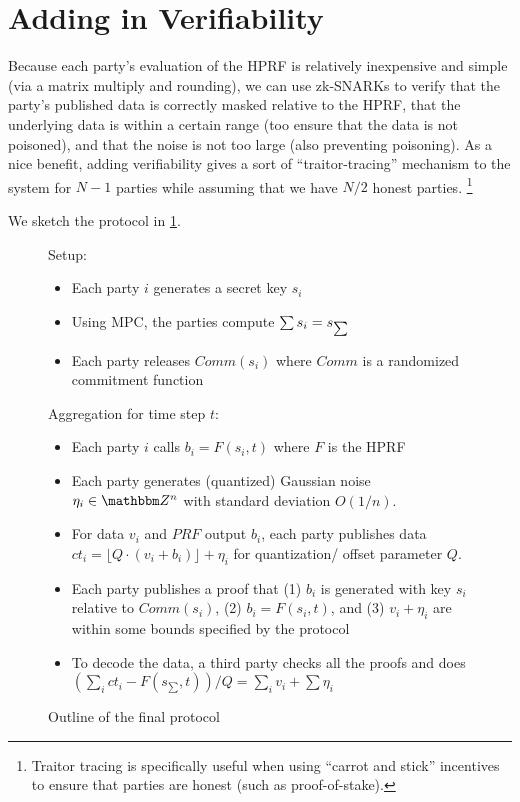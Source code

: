 \section{Adding in Verifiability}
Because each party's evaluation of the HPRF is relatively inexpensive and simple (via a matrix multiply and rounding), we can use zk-SNARKs to verify that the party's published data is correctly masked relative to the HPRF, that the underlying data is within a certain range (too ensure that the data is not poisoned), and that the noise is not too large (also preventing poisoning).
As a nice benefit, adding verifiability gives a sort of ``traitor-tracing'' mechanism to the system for $N - 1$ parties while assuming that we have $N /2$ honest parties.
\footnote{Traitor tracing is specifically useful when using ``carrot and stick'' incentives to ensure that parties are honest (such as proof-of-stake).}

We sketch the protocol in \cref{fig:prot}.


\begin{figure}[H]
	\begin{mdframed}
		Setup: \begin{itemize}
			\item Each party $i$ generates a secret key $s_i$
			\item Using MPC, the parties compute $\sum s_i = s_{\sum}$
			\item Each party releases $Comm(s_i)$ where $Comm$ is a randomized commitment function
		\end{itemize}
		Aggregation for time step $t$: \begin{itemize}
			\item Each party $i$ calls $b_i = F(s_i, t)$  where $F$ is the HPRF
			\item Each party generates (quantized) Gaussian noise $\eta_i \in \Z^n$ with standard deviation $O(1/n)$.
			\item  For data $v_i$ and $PRF$ output $b_i$,
				each party publishes data $ct_i = \lfloor Q \cdot (v_i + b_i) \rfloor  + \eta_i$ for quantization/ offset parameter $Q$.
			\item Each party publishes a proof that (1) $b_i$ is generated with key $s_i$ relative to $Comm(s_i)$, (2) $b_i = F(s_i, t)$, and (3) $v_i + \eta_i$ are within some bounds specified by the protocol
			\item To decode the data, a third party checks all the proofs and does $\left(\sum_i ct_i - F(s_{\sum}, t)\right) / Q = \sum_i v_i + \sum \eta_i$
		\end{itemize}
	\end{mdframed}
	\caption{Outline of the final protocol}
	\label{fig:prot}
\end{figure}


